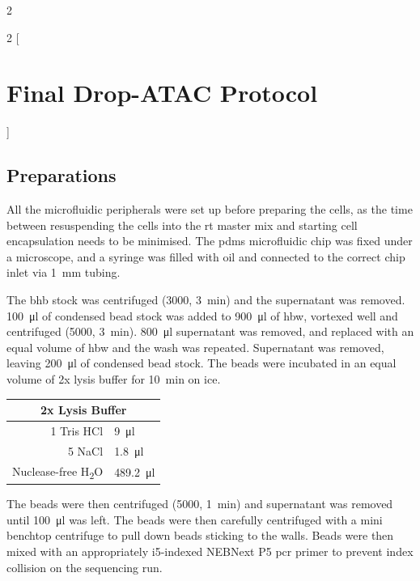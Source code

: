 \begin{appendix}
\begin{multicols}{2}
\end{multicols}

\newpage
\begin{multicols}{2}
[\section{Final Drop-ATAC Protocol}\label{app:meth_dropatac}]
\subsection{Preparations}
All the microfluidic peripherals were set up before preparing the cells, as the time between resuspending the cells into the \acrshort{rt} master mix and starting cell encapsulation needs to be minimised. The \acrshort{pdms} microfluidic chip was fixed under a microscope, and a syringe was filled with oil and connected to the correct chip inlet via \SI{1}{\mm} tubing.\pms

The \acrshort{bhb} stock was centrifuged (\SI{3000}{\rcf}, \SI{3}{\minute}) and the supernatant was removed. \SI{100}{\ul} of condensed bead stock was added to \SI{900}{\ul} of \acrshort{hbw}, vortexed well and centrifuged (\SI{5000}{\rcf}, \SI{3}{\minute}). \SI{800}{\ul} supernatant was removed, and replaced with an equal volume of \acrshort{hbw} and the wash was repeated. Supernatant was removed, leaving \SI{200}{\ul} of condensed bead stock. The beads were incubated in an equal volume of 2x lysis buffer for \SI{10}{\minute} on ice.\pms

\begin{center}
\begin{tabular}{r|l}
	\multicolumn{2}{c}{2x Lysis Buffer} \\
	\hline
	\SI{1}{\molar} Tris HCl  & \SI{9}{\ul} \\
	\SI{5}{\molar} NaCl & \SI{1.8}{\ul} \\
	Nuclease-free H\textsubscript{2}O & \SI{489.2}{\ul} \\
\end{tabular}
\end{center}
\medskip

 The beads were then centrifuged (\SI{5000}{\rcf}, \SI{1}{\minute}) and supernatant was removed until \SI{100}{\ul} was left. The beads were then carefully centrifuged with a mini benchtop centrifuge to pull down beads sticking to the walls. Beads were then mixed with an appropriately i5-indexed NEBNext P5 \acrshort{pcr} primer to prevent index collision on the sequencing run.\pms


\end{multicols}
\end{appendix}
